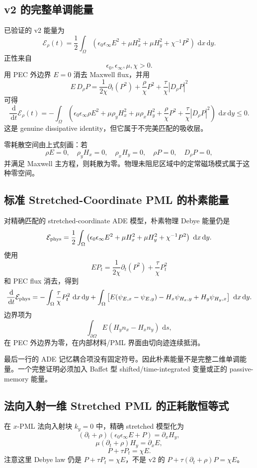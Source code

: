 \documentclass[UTF8,a4paper,11pt]{ctexart}
\newcommand{\dd}{\,\mathrm d}
\newcommand{\Om}{\Omega}
\newcommand{\Ecal}{\mathcal E}
\begin{document}
\subsection{v2 的完整单调能量}

已验证的 v2 能量为
\[
\Ecal_\rho(t)=\frac12\int_\Om
\left(
\epsilon_0\epsilon_\infty E^2+\mu H_x^2+\mu H_y^2+\chi^{-1}P^2
\right)\,\dd x\dd y.
\]
正性来自
\[
\epsilon_0,\epsilon_\infty,\mu,\chi>0.
\]
用 PEC 外边界 \(E=0\) 消去 Maxwell flux，并用
\[
E\,D_\rho P
=\frac{1}{2\chi}\partial_t(P^2)
+\frac{\rho}{\chi}P^2
+\frac{\tau}{\chi}|D_\rho P|^2
\]
可得
\[
\boxed{
\frac{\dd}{\dd t}\Ecal_\rho(t)
=-\int_\Om\left(
\epsilon_0\epsilon_\infty\rho E^2
+\mu\rho_yH_x^2
+\mu\rho_xH_y^2
+\frac{\rho}{\chi}P^2
+\frac{\tau}{\chi}|D_\rho P|^2
\right)\,\dd x\dd y\le0.}
\]
这是 genuine dissipative identity，但它属于不完美匹配的吸收层。

零耗散空间由上式刻画：若
\[
\rho E=0,\quad \rho_yH_x=0,\quad \rho_xH_y=0,\quad \rho P=0,\quad
D_\rho P=0,
\]
并满足 Maxwell 主方程，则耗散为零。物理未阻尼区域中的定常磁场模式属于这种零空间。

\subsection{标准 Stretched-Coordinate PML 的朴素能量}

对精确匹配的 stretched-coordinate ADE 模型，朴素物理 Debye 能量仍是
\[
\Ecal_{\rm phys}
=\frac12\int_\Om
\left(
\epsilon_0\epsilon_\infty E^2+\mu H_x^2+\mu H_y^2+\chi^{-1}P^2
\right)\,\dd x\dd y.
\]
使用
\[
E P_t
=\frac{1}{2\chi}\partial_t(P^2)+\frac{\tau}{\chi}P_t^2
\]
和 PEC flux 消去，得到
\[
\frac{\dd}{\dd t}\Ecal_{\rm phys}
=-\int_\Om\frac{\tau}{\chi}P_t^2\,\dd x\dd y
+\int_\Om
\left[
E(\psi_{E,x}-\psi_{E,y})
-H_x\psi_{H_x,y}
+H_y\psi_{H_y,x}
\right]\,\dd x\dd y .
\]
边界项为
\[
\int_{\partial\Om}E(H_y n_x-H_x n_y)\,\dd s,
\]
在 PEC 外边界为零，在内部材料/PML 界面由切向迹连续抵消。

最后一行的 ADE 记忆耦合项没有固定符号。因此朴素能量不是完整二维单调能量。一个完整证明必须加入 Baffet 型 shifted/time-integrated 变量或正的 passive-memory 能量。

\subsection{法向入射一维 Stretched PML 的正耗散恒等式}

在 \(x\)-PML 法向入射块 \(k_y=0\) 中，精确 stretched 模型化为
\[
(\partial_t+\rho)(\epsilon_0\epsilon_\infty E+P)=\partial_xH_y,
\]
\[
\mu(\partial_t+\rho)H_y=\partial_xE,
\]
\[
P+\tau P_t=\chi E.
\]
注意这里 Debye law 仍是 \(P+\tau P_t=\chi E\)，不是 v2 的
\(P+\tau(\partial_t+\rho)P=\chi E\)。
\end{document}
